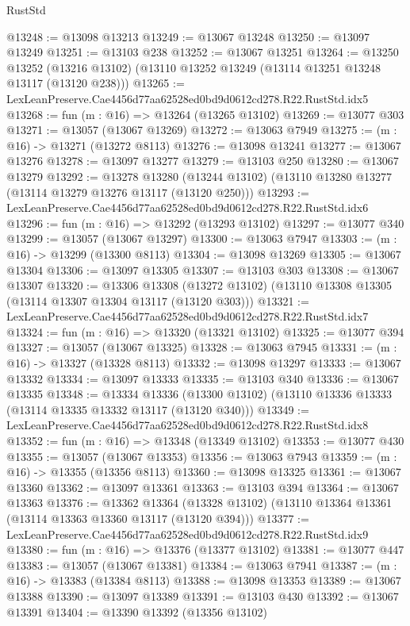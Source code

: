 \begin{lexlean}{RustStd}
\begin{coremodule}
@13248 := @13098 @13213
@13249 := @13067 @13248
@13250 := @13097 @13249
@13251 := @13103 @238
@13252 := @13067 @13251
@13264 := @13250
    @13252
    (@13216 @13102)
    (@13110 @13252 @13249 (@13114 @13251 @13248 @13117 (@13120 @238)))
@13265 := LexLeanPreserve.Cae4456d77aa62528ed0bd9d0612cd278.R22.RustStd.idx5
@13268 := fun (m : @16) => @13264 (@13265 @13102)
@13269 := @13077 @303
@13271 := @13057 (@13067 @13269)
@13272 := @13063 @7949
@13275 := (m : @16) -> @13271 (@13272 @8113)
@13276 := @13098 @13241
@13277 := @13067 @13276
@13278 := @13097 @13277
@13279 := @13103 @250
@13280 := @13067 @13279
@13292 := @13278
    @13280
    (@13244 @13102)
    (@13110 @13280 @13277 (@13114 @13279 @13276 @13117 (@13120 @250)))
@13293 := LexLeanPreserve.Cae4456d77aa62528ed0bd9d0612cd278.R22.RustStd.idx6
@13296 := fun (m : @16) => @13292 (@13293 @13102)
@13297 := @13077 @340
@13299 := @13057 (@13067 @13297)
@13300 := @13063 @7947
@13303 := (m : @16) -> @13299 (@13300 @8113)
@13304 := @13098 @13269
@13305 := @13067 @13304
@13306 := @13097 @13305
@13307 := @13103 @303
@13308 := @13067 @13307
@13320 := @13306
    @13308
    (@13272 @13102)
    (@13110 @13308 @13305 (@13114 @13307 @13304 @13117 (@13120 @303)))
@13321 := LexLeanPreserve.Cae4456d77aa62528ed0bd9d0612cd278.R22.RustStd.idx7
@13324 := fun (m : @16) => @13320 (@13321 @13102)
@13325 := @13077 @394
@13327 := @13057 (@13067 @13325)
@13328 := @13063 @7945
@13331 := (m : @16) -> @13327 (@13328 @8113)
@13332 := @13098 @13297
@13333 := @13067 @13332
@13334 := @13097 @13333
@13335 := @13103 @340
@13336 := @13067 @13335
@13348 := @13334
    @13336
    (@13300 @13102)
    (@13110 @13336 @13333 (@13114 @13335 @13332 @13117 (@13120 @340)))
@13349 := LexLeanPreserve.Cae4456d77aa62528ed0bd9d0612cd278.R22.RustStd.idx8
@13352 := fun (m : @16) => @13348 (@13349 @13102)
@13353 := @13077 @430
@13355 := @13057 (@13067 @13353)
@13356 := @13063 @7943
@13359 := (m : @16) -> @13355 (@13356 @8113)
@13360 := @13098 @13325
@13361 := @13067 @13360
@13362 := @13097 @13361
@13363 := @13103 @394
@13364 := @13067 @13363
@13376 := @13362
    @13364
    (@13328 @13102)
    (@13110 @13364 @13361 (@13114 @13363 @13360 @13117 (@13120 @394)))
@13377 := LexLeanPreserve.Cae4456d77aa62528ed0bd9d0612cd278.R22.RustStd.idx9
@13380 := fun (m : @16) => @13376 (@13377 @13102)
@13381 := @13077 @447
@13383 := @13057 (@13067 @13381)
@13384 := @13063 @7941
@13387 := (m : @16) -> @13383 (@13384 @8113)
@13388 := @13098 @13353
@13389 := @13067 @13388
@13390 := @13097 @13389
@13391 := @13103 @430
@13392 := @13067 @13391
@13404 := @13390
    @13392
    (@13356 @13102)

\end{coremodule}
\end{lexlean}
